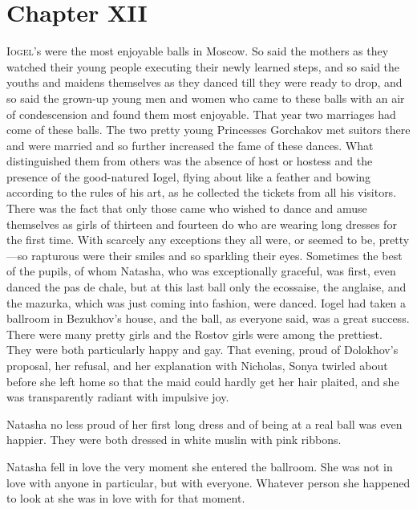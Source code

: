 \chapter*{Chapter XII}
\ifaudio     
{} 
\fi

\lettrine[lines=2, loversize=0.3, lraise=0]{\initfamily I}{ogel}'s
were the most enjoyable balls in Moscow. So said the
mothers as they watched their young people executing their newly
learned steps, and so said the youths and maidens themselves as
they danced till they were ready to drop, and so said the
grown-up young men and women who came to these balls with an air
of condescension and found them most enjoyable.  That year two
marriages had come of these balls. The two pretty young
Princesses Gorchakov met suitors there and were married and so
further increased the fame of these dances. What distinguished
them from others was the absence of host or hostess and the
presence of the good-natured Iogel, flying about like a feather
and bowing according to the rules of his art, as he collected the
tickets from all his visitors. There was the fact that only those
came who wished to dance and amuse themselves as girls of
thirteen and fourteen do who are wearing long dresses for the
first time. With scarcely any exceptions they all were, or seemed
to be, pretty---so rapturous were their smiles and so sparkling
their eyes.  Sometimes the best of the pupils, of whom Natasha,
who was exceptionally graceful, was first, even danced the pas de
chale, but at this last ball only the ecossaise, the anglaise,
and the mazurka, which was just coming into fashion, were
danced. Iogel had taken a ballroom in Bezukhov's house, and the
ball, as everyone said, was a great success. There were many
pretty girls and the Rostov girls were among the prettiest. They
were both particularly happy and gay. That evening, proud of
Dolokhov's proposal, her refusal, and her explanation with
Nicholas, Sonya twirled about before she left home so that the
maid could hardly get her hair plaited, and she was transparently
radiant with impulsive joy.

Natasha no less proud of her first long dress and of being at a
real ball was even happier. They were both dressed in white
muslin with pink ribbons.

Natasha fell in love the very moment she entered the
ballroom. She was not in love with anyone in particular, but with
everyone. Whatever person she happened to look at she was in love
with for that moment.

